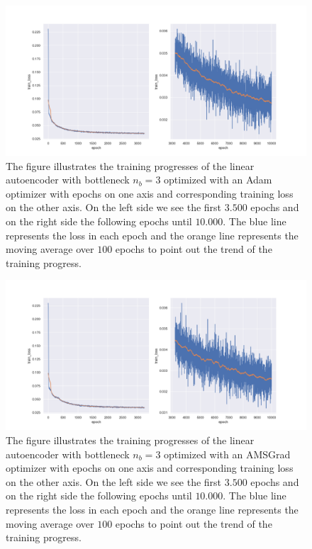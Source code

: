 \begin{figure}
\begin{center}
\includegraphics[width=\linewidth]{linear_AE_3d_adam_training_progress}
\end{center}
\caption{The figure illustrates the training progresses of the linear autoencoder with bottleneck $n_b=3$ optimized with an Adam optimizer with epochs on one axis and corresponding training loss on the other axis. On the left side we see the first $3.500$ epochs and on the right side the following epochs until $10.000$. The blue line represents the loss in each epoch and the orange line represents the moving average over $100$ epochs to point out the trend of the training progress.}\label{fig:linear_AE_3d_adam_training_progress}
\end{figure}


\begin{figure}
\begin{center}
\includegraphics[width=\linewidth]{linear_AE_3d_amsgrad_training_progress}
\end{center}
\caption{The figure illustrates the training progresses of the linear autoencoder with bottleneck $n_b=3$ optimized with an AMSGrad optimizer with epochs on one axis and corresponding training loss on the other axis. On the left side we see the first $3.500$ epochs and on the right side the following epochs until $10.000$. The blue line represents the loss in each epoch and the orange line represents the moving average over $100$ epochs to point out the trend of the training progress.}\label{fig:linear_AE_3d_amsgrad_training_progress}
\end{figure}

